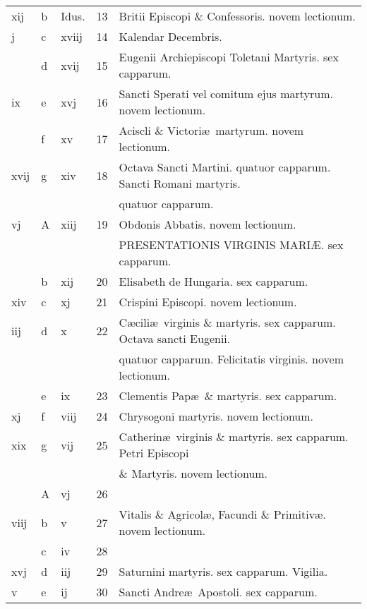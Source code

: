 \documentclass[letter,11pt]{book}
\begin{document}
\begin{center}
\begin{tabular}{l | l | l | r | l}
\color{Red} xij & b & Idus. & 13 & Britii Episcopi \& Confessoris. \color{Red} novem lectionum. \\
\color{Red} j & c & \color{Red} xviij & 14 & \qquad Kalendar Decembris. \\
\color{Red}  & d & \color{Red} xvij & 15 & \color{Red} Eugenii Archiepiscopi Toletani Martyris. \color{black} sex capparum. \\
\color{Red} ix & e & \color{Red} xvj & 16 & Sancti Sperati vel comitum ejus martyrum. \color{Red} novem lectionum. \\
\color{Red}  & f & \color{Red} xv & 17 & Aciscli \& Victori\ae \ martyrum. \color{Red} novem lectionum. \\
\color{Red} xvij & g & \color{Red} xiv & 18 & Octava Sancti Martini. \color{Red} quatuor capparum. \color{black} Sancti Romani martyris. \\
 &  &  &  & \quad \color{Red} quatuor capparum. \\
\color{Red} vj & \color{Red} A & \color{Red} xiij & 19 & Obdonis Abbatis. \color{Red} novem lectionum. \\
 &  &  &  & \quad \color{black} PRESENTATIONIS VIRGINIS MARI\AE . \color{Red} sex capparum. \\
\color{Red}  & b & \color{Red} xij & 20 & Elisabeth de Hungaria. \color{Red} sex capparum. \\
\color{Red} xiv & c & \color{Red} xj & 21 & Crispini Episcopi. \color{Red} novem lectionum. \\
\color{Red} iij & d & \color{Red} x & 22 & C\ae cili\ae \ virginis \& martyris. \color{Red} sex capparum. \color{black} Octava sancti Eugenii. \\
 &  &  &  & \quad \color{Red} quatuor capparum. \color{black} Felicitatis virginis. \color{Red} novem lectionum. \\
\color{Red}  & e & \color{Red} ix & 23 & Clementis Pap\ae \ \& martyris. \color{Red} sex capparum. \\
\color{Red} xj & f & \color{Red} viij & 24 & Chrysogoni martyris. \color{Red} novem lectionum. \\
\color{Red} xix & g & \color{Red} vij & 25 & Catherin\ae \ virginis \& martyris. \color{Red} sex capparum. \color{black} Petri Episcopi \\
 &  &  &  & \quad \& Martyris. \color{Red} novem lectionum. \\
\color{Red}  & \color{Red} A & \color{Red} vj & 26 & \\
\color{Red} viij & b & \color{Red} v & 27 & Vitalis \& Agricol\ae , Facundi \& Primitiv\ae . \color{Red} novem lectionum. \\
\color{Red}  & c & \color{Red} iv & 28 & \\
\color{Red} xvj & d & \color{Red} iij & 29 & Saturnini martyris. \color{Red} sex capparum. \color{black} Vigilia. \\
\color{Red} v & e & \color{Red} ij & 30 & \color{Red} Sancti Andre\ae \ Apostoli. \color{black} sex capparum. \\
\end{tabular}
\end{center}
\end{document}
